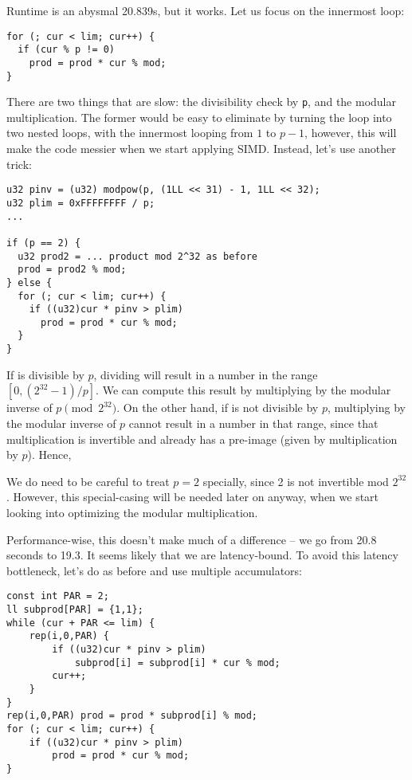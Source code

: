 \documentclass[openany]{book}
\begin{document}
Runtime is an abysmal 20.839s, but it works.
Let us focus on the innermost loop:
\begin{lstlisting}
for (; cur < lim; cur++) {
  if (cur % p != 0)
    prod = prod * cur % mod;
}
\end{lstlisting}

There are two things that are slow: the divisibility check by \texttt{p}, and the modular multiplication.
The former would be easy to eliminate by turning the loop into two nested loops, with the innermost looping from $1$ to $p-1$, however, this will make the code messier when we start applying SIMD.
Instead, let's use another trick:

\begin{lstlisting}
u32 pinv = (u32) modpow(p, (1LL << 31) - 1, 1LL << 32);
u32 plim = 0xFFFFFFFF / p;
...

if (p == 2) {
  u32 prod2 = ... product mod 2^32 as before
  prod = prod2 % mod;
} else {
  for (; cur < lim; cur++) {
    if ((u32)cur * pinv > plim)
      prod = prod * cur % mod;
  }
}
\end{lstlisting}

If \verb@cur@ is divisible by $p$, dividing will result in a number in the range $[0, (2^{32}-1) / p]$.
We can compute this result by multiplying by the modular inverse of $p \pmod{2^{32}}$.
On the other hand, if \verb@cur@ is not divisible by $p$, multiplying by the modular inverse of $p$ cannot result in a number in that range, since that multiplication is invertible and already has a pre-image (given by multiplication by $p$).
Hence, \verb@cur % p == 0@ can be replaced by \verb@(u32)cur * pinv <= plim@, multiplication being a much cheaper operation than modulo.

We do need to be careful to treat $p = 2$ specially, since 2 is not invertible mod $2^{32}$.
However, this special-casing will be needed later on anyway, when we start looking into optimizing the modular multiplication.

Performance-wise, this doesn't make much of a difference -- we go from 20.8 seconds to 19.3.
It seems likely that we are latency-bound.
To avoid this latency bottleneck, let's do as before and use multiple accumulators:

\begin{lstlisting}
const int PAR = 2;
ll subprod[PAR] = {1,1};
while (cur + PAR <= lim) {
	rep(i,0,PAR) {
		if ((u32)cur * pinv > plim)
			subprod[i] = subprod[i] * cur % mod;
		cur++;
	}
}
rep(i,0,PAR) prod = prod * subprod[i] % mod;
for (; cur < lim; cur++) {
	if ((u32)cur * pinv > plim)
		prod = prod * cur % mod;
}
\end{lstlisting}
\end{document}
